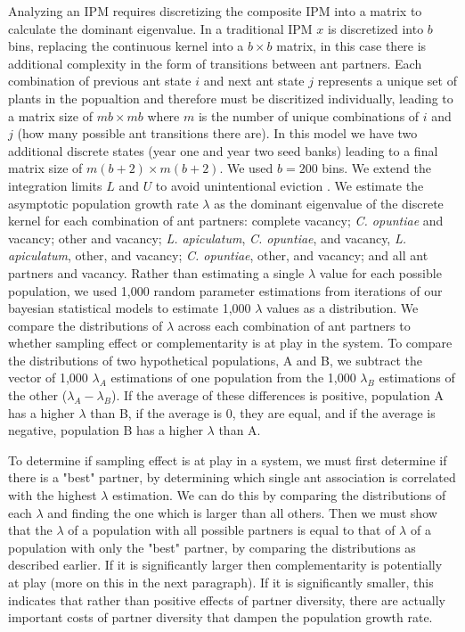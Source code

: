 \documentclass[11pt]{article}
\begin{document}
Analyzing an IPM requires discretizing the composite IPM into a matrix to calculate the dominant eigenvalue. 
In a traditional IPM $x$ is discretized into $b$ bins, replacing the continuous kernel into a $b \times b$ matrix, in this case there is additional complexity in the form of transitions between ant partners. 
Each combination of previous ant state $i$ and next ant state $j$ represents a unique set of plants in the popualtion and therefore must be discritized individually, leading to a matrix size of $m b \times m b$ where $m$ is the number of unique combinations of $i$ and $j$ (how many possible ant transitions there are). 
In this model we have two additional discrete states (year one and year two seed banks) leading to a final matrix size of $m(b+2) \times m(b+2)$.
We used $b = 200$ bins.
We extend the integration limits $L$ and $U$ to avoid unintentional eviction \cite{Williams2012}.
We estimate the asymptotic population growth rate $\lambda$ as the dominant eigenvalue of the discrete kernel for each combination of ant partners: complete vacancy; \textit{C. opuntiae} and vacancy; other and vacancy; \textit{L. apiculatum}, \textit{C. opuntiae}, and vacancy, \textit{L. apiculatum}, other, and vacancy; \textit{C. opuntiae}, other, and vacancy; and all ant partners and vacancy.
Rather than estimating a single $\lambda$ value for each possible population, we used 1,000 random parameter estimations from iterations of our bayesian statistical models to estimate 1,000 $\lambda$ values as a distribution.
We compare the distributions of $\lambda$ across each combination of ant partners to whether sampling effect or complementarity is at play in the system.
To compare the distributions of two hypothetical populations, A and B, we subtract the vector of 1,000 $\lambda_A$ estimations of one population from the 1,000 $\lambda_B$ estimations of the other ($\lambda_A - \lambda_B$).
If the average of these differences is positive, population A has a higher $\lambda$ than B, if the average is 0, they are equal, and if the average is negative, population B has a higher $\lambda$ than A. 

To determine if sampling effect is at play in a system, we must first determine if there is a "best" partner, by determining which single ant association is correlated with the highest $\lambda$ estimation.
We can do this by comparing the distributions of each $\lambda$ and finding the one which is larger than all others.
Then we must show that the $\lambda$ of a population with all possible partners is equal to that of $\lambda$ of a population with only the "best" partner, by comparing the distributions as described earlier.
If it is significantly larger then complementarity is potentially at play (more on this in the next paragraph).
If it is significantly smaller, this indicates that rather than positive effects of partner diversity, there are actually important costs of partner diversity that dampen the population growth rate.
\end{document}
